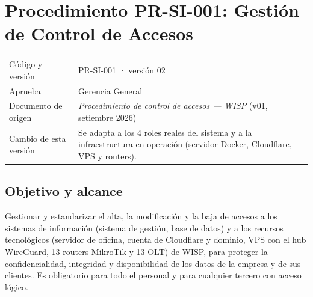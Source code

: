 
\chapter{Procedimiento PR-SI-001: Gestión de Control de Accesos}
\label{anx:sgsi-accesos}

\begin{table}[htbp]
\centering
\small
\begin{tabularx}{\textwidth}{L{3cm}X}
\toprule
Código y versión & PR-SI-001 · versión 02 \\
Aprueba & Gerencia General \\
Documento de origen & \emph{Procedimiento de control de accesos --- WISP} (v01, setiembre 2026) \\
Cambio de esta versión & Se adapta a los 4 roles reales del sistema y a la infraestructura en operación (servidor Docker, Cloudflare, VPS y routers). \\
\bottomrule
\end{tabularx}
\end{table}

\section{Objetivo y alcance}
Gestionar y estandarizar el alta, la modificación y la baja de accesos a los sistemas de
información (sistema de gestión, base de datos) y a los recursos tecnológicos (servidor de
oficina, cuenta de Cloudflare y dominio, VPS con el hub WireGuard, 13 routers MikroTik y 13
OLT) de WISP, para proteger la confidencialidad, integridad y disponibilidad de los datos de
la empresa y de sus clientes. Es obligatorio para todo el personal y para cualquier tercero
con acceso lógico.


